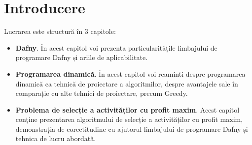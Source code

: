 \chapter*{Introducere} 

Lucrarea este structură în 3 capitole:

\begin{itemize}
  \item \textbf {Dafny}. În acest capitol voi prezenta particularitățile limbajului de programare Dafny și ariile de aplicabilitate.
  \item \textbf {Programarea dinamică}. În acest capitol voi reaminti despre programarea dinamică ca tehnică de proiectare a algoritmilor, despre avantajele sale în comparație cu alte tehnici de proiectare, precum Greedy. 
  \item \textbf {Problema de selecție a activităților cu profit maxim}. Acest capitol conține prezentarea algoritmului de selecție a activităților cu profit maxim, demonstrația de corectitudine cu ajutorul limbajului de programare Dafny și tehnica de lucru abordată. 
\end{itemize}

